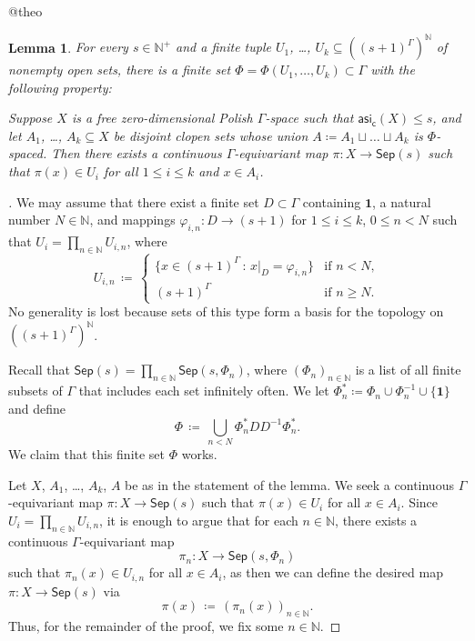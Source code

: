 \documentclass[11pt,reqno,psamsfonts]{amsart}
\makeatletter
\theoremstyle{bfnote}
\newtheorem{lemma}[theo]{Lemma}
\theoremstyle{definition}
\theoremstyle{remark}
\newcommand{\neutralize}[1]{\expandafter\let\csname c@#1\endcsname\count@}
\newenvironment{lemmacopy}[1]
{\renewcommand{\thetheo}{\ref{#1}}%
	\neutralize{theo}\phantomsection
	\begin{lemma}}
	{\end{lemma}}
\newcommand{\0}{\varnothing}
\newcommand{\set}[1]{\{#1\}}
\renewcommand{\phi}{\varphi}
\renewcommand{\leq}{\leqslant}
\renewcommand{\geq}{\geqslant}
\newcommand{\defeq}{\coloneqq}
\newcommand{\G}{\Gamma}
\newcommand{\rest}[2]{{{#1}\vert_{#2}}}
\newcommand{\N}{\mathbb{N}}
\newcommand{\asi}{\mathsf{asi}}
\newcommand{\casi}{\asi_{\mathsf{c}}}
\newcommand{\iden}{\mathbf{1}}
\newcommand{\Sep}{\mathsf{Sep}}
\numberwithin{equation}{section}
\newenvironment{scproof}[1][]{\begin{proof}[\textsc{\upshape{Proof}}#1]}{\end{proof}}
\makeatother
\begin{document}
    \begin{lemmacopy}{lemma:from_separation_to_map}
       For every $s \in \N^+$ and a finite tuple $U_1$, \ldots, $U_k \subseteq ((s+1)^\G)^\N$ of nonempty open sets, there is a finite set $\Phi = \Phi(U_1, \ldots, U_k) \subset \G$ with the following property:

       \smallskip
       
       \noindent Suppose $X$ is a free zero-dimensional Polish $\G$-space such that $\casi(X) \leq s$, and let $A_1$, \ldots, $A_k \subseteq X$ be disjoint clopen sets whose union $A \defeq A_1 \sqcup \ldots \sqcup A_k$ is $\Phi$-spaced. Then there exists a continuous $\G$-equivariant map $\pi \colon X \to \Sep(s)$ such that $\pi(x) \in U_i$
        for all $1 \leq i \leq k$ and $x \in A_i$.
    \end{lemmacopy}
    \begin{scproof}
        We may assume that there exist a finite set $D \subset \G$ containing $\iden$, a natural number $N \in \N$, and mappings $\phi_{i,n} \colon D \to (s+1)$ for $1 \leq i \leq k$, $0 \leq n < N$ such that %
        $
            U_i = \prod_{n \in \N} U_{i,n} %
        $,
        where %
        \[
            U_{i,n} \,\defeq\, \begin{cases}
                \big\{x \in (s+1)^{\G} \,:\, \rest{x}{D} = \phi_{i,n} \big\} &\text{if } n < N,\\
                (s+1)^\G &\text{if } n \geq N.
            \end{cases}
        \]
        No generality is lost because sets of this type form a basis for the topology on $((s+1)^{\G})^{\N}$.
        
        Recall that $\Sep(s) = \prod_{n \in \N} \Sep(s, \Phi_n)$, where $(\Phi_n)_{n \in \N}$ is a list of all finite subsets of $\G$ that includes each set infinitely often. We let $\Phi_n^* \defeq \Phi_n \cup \Phi_n^{-1} \cup \set{\iden}$ and define
        \[
             \Phi \,\defeq\, \bigcup_{n < N} \Phi_n^* DD^{-1}\Phi_n^*.
        \]
        We claim that this finite set $\Phi$ works.
        
        Let $X$, $A_1$, \ldots, $A_k$, $A$ be as in the statement of the lemma. We seek a continuous $\G$-equivariant map $\pi \colon X \to \Sep(s)$ such that $\pi(x) \in U_i$ for all $x \in A_i$. Since $U_i = \prod_{n \in \N} U_{i,n}$, it is enough to argue that for each $n \in \N$, there exists a continuous $\G$-equivariant map
            \[
                \pi_n \colon X \to \Sep(s, \Phi_n)
        \]
        such that $\pi_n(x) \in U_{i,n}$ for all $x \in A_i$, as then we can define the desired map $\pi \colon X \to \Sep(s)$ via
        \[  
            \pi(x) \,\defeq\, (\pi_n(x))_{n \in \N}.
        \]
        Thus, for the remainder of the proof, we fix some $n \in \N$.
        

\end{scproof}
\end{document}
